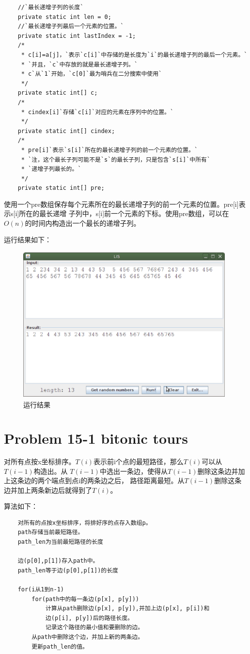 \documentclass[a4paper, 11pt]{article}
\begin{document}
\begin{lstlisting}
	//`最长递增子列的长度`
	private static int len = 0;
	//`最长递增子列最后一个元素的位置。`
	private static int lastIndex = -1;
	/*
	 * c[i]=a[j]，`表示`c[i]`中存储的是长度为`i`的最长递增子列的最后一个元素。`
	 * `并且，`c`中存放的就是最长递增子列。`
	 * c`从`1`开始，`c[0]`最为哨兵在二分搜索中使用`
	 */
	private static int[] c;
	/*
	 * cindex[i]`存储`c[i]`对应的元素在序列中的位置。`
	 */
	private static int[] cindex;
	/*
	 * pre[i]`表示`s[i]`所在的最长递增子列的前一个元素的位置。`
	 * `注，这个最长子列可能不是`s`的最长子列，只是包含`s[i]`中所有`
	 * `递增子列最长的。`
	 */
	private static int[] pre;
\end{lstlisting}

使用一个pre数组保存每个元素所在的最长递增子列的前一个元素的位置。pre[i]表示s[i]所在的最长递增
子列中，s[i]前一个元素的下标。使用pre数组，可以在$O(n)$的时间内构造出一个最长的递增子列。

运行结果如下：

\begin{figure}[htbp]
\centering
\caption{运行结果}
\includegraphics[height=8cm, width=11cm]{LIS.eps}
\end{figure}

\section{Problem 15-1 bitonic tours}

对所有点按x坐标排序。$T(i)$表示前i个点的最短路径，那么$T(i)$可以从$T(i - 1)$构造出。从
$T(i-1)$中选出一条边，使得从$T(i-1)$删除这条边并加上这条边的两个端点到点i的两条边之后，
路径距离最短。从$T(i-1)$删除这条边并加上两条新边后就得到了$T(i)$。

算法如下：
\begin{verbatim}
    对所有的点按x坐标排序，将排好序的点存入数组p。
    path存储当前最短路径。
    path_len为当前最短路径的长度
	
    边(p[0],p[1])存入path中。
    path_len等于边(p[0],p[1])的长度
	
    for(i从1到n-1)
        for(path中的每一条边(p[x], p[y]))
            计算从path删除边(p[x], p[y]),并加上边(p[x], p[i])和
            边(p[i], p[y])后的路径长度。
            记录这个路径的最小值和要删除的边。
        从path中删除这个边，并加上新的两条边。
        更新path_len的值。
\end{verbatim}
	
\end{document}
